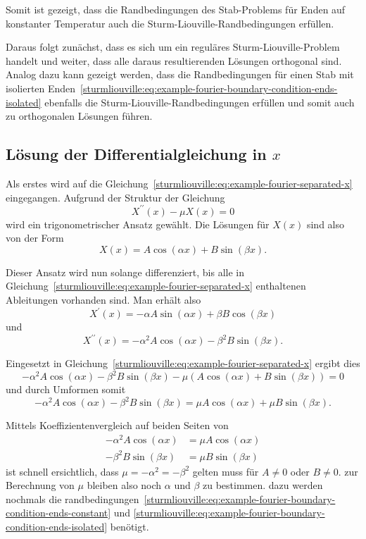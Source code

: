 Somit ist gezeigt, dass die Randbedingungen des Stab-Problems für Enden auf
konstanter Temperatur auch die Sturm-Liouville-Randbedingungen erfüllen.

Daraus folgt zunächst, dass es sich um ein reguläres Sturm-Liouville-Problem
handelt und weiter, dass alle daraus resultierenden Lösungen orthogonal sind.
Analog dazu kann gezeigt werden, dass die Randbedingungen für einen Stab mit
isolierten
Enden~\eqref{sturmliouville:eq:example-fourier-boundary-condition-ends-isolated}
ebenfalls die Sturm-Liouville-Randbedingungen erfüllen und
somit auch zu orthogonalen Lösungen führen.

%
%

\subsection{Lösung der Differentialgleichung in \texorpdfstring{$x$}{x}}
Als erstes wird auf die
Gleichung~\eqref{sturmliouville:eq:example-fourier-separated-x} eingegangen.
Aufgrund der Struktur der Gleichung
\[
    X^{\prime \prime}(x) - \mu X(x)
    =
    0
\]
wird ein trigonometrischer Ansatz gewählt.
Die Lösungen für $X(x)$ sind also von der Form
\[
    X(x)
    =
    A \cos ( \alpha x) + B \sin ( \beta x).
\]

Dieser Ansatz wird nun solange differenziert, bis alle in
Gleichung~\eqref{sturmliouville:eq:example-fourier-separated-x} enthaltenen
Ableitungen vorhanden sind.
Man erhält also
\[
    X^{\prime}(x)
    =
    - \alpha A \sin ( \alpha x ) +
    \beta B \cos ( \beta x )
\]
und
\[
    X^{\prime \prime}(x)
    =
    -\alpha^{2} A \cos ( \alpha x ) -
    \beta^{2} B \sin ( \beta x ).
\]

Eingesetzt in Gleichung~\eqref{sturmliouville:eq:example-fourier-separated-x}
ergibt dies
\[
    -\alpha^{2}A\cos(\alpha x) - \beta^{2}B\sin(\beta x) -
    \mu(A\cos(\alpha x) + B\sin(\beta x))
    =
    0
\]
und durch Umformen somit
\[
    -\alpha^{2}A\cos(\alpha x) - \beta^{2}B\sin(\beta x)
    =
    \mu A\cos(\alpha x) + \mu B\sin(\beta x).
\]

Mittels Koeffizientenvergleich auf beiden Seiten von
\[
\begin{aligned}
    -\alpha^{2}A\cos(\alpha x)
    &=
    \mu A\cos(\alpha x)
    \\
    -\beta^{2}B\sin(\beta x)
    &=
    \mu B\sin(\beta x)
\end{aligned}
\]
ist schnell ersichtlich, dass $ \mu = -\alpha^{2} = -\beta^{2} $ gelten muss für
$ A \neq 0 $ oder $ B \neq 0 $.
zur Berechnung von $ \mu $ bleiben also noch  $ \alpha $ und $ \beta $ zu
bestimmen.
dazu werden nochmals die
randbedingungen~\eqref{sturmliouville:eq:example-fourier-boundary-condition-ends-constant} 
und \eqref{sturmliouville:eq:example-fourier-boundary-condition-ends-isolated}
benötigt.

